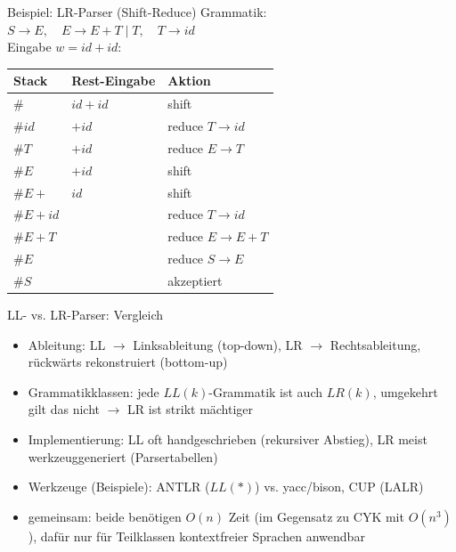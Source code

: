 \begin{frame}{Beispiel: LR-Parser (Shift-Reduce)}
	Grammatik: $S \rightarrow E, \quad E \rightarrow E+T \mid T, \quad T \rightarrow id$\\
	Eingabe $w=id+id$:\\[0.3em]
	\centering
	\begin{tabular}{|l|l|l|}
		\hline
		Stack & Rest-Eingabe & Aktion \\
		\hline
		\# & $id+id$ & shift \\
		\#$id$ & $+id$ & reduce $T\rightarrow id$ \\
		\#$T$ & $+id$ & reduce $E\rightarrow T$ \\
		\#$E$ & $+id$ & shift \\
		\#$E{+}$ & $id$ & shift \\
		\#$E{+}id$ &  & reduce $T\rightarrow id$ \\
		\#$E{+}T$ &  & reduce $E\rightarrow E{+}T$ \\
		\#$E$ &  & reduce $S\rightarrow E$ \\
		\#$S$ &  & akzeptiert \\
		\hline
	\end{tabular}
\end{frame}

\begin{frame}{LL- vs. LR-Parser: Vergleich}
	\begin{itemize}
		\item Ableitung: LL $\rightarrow$ Linksableitung (top-down), LR $\rightarrow$ Rechtsableitung, rückwärts rekonstruiert (bottom-up)
		\item Grammatikklassen: jede $LL(k)$-Grammatik ist auch $LR(k)$, umgekehrt gilt das nicht $\rightarrow$ LR ist strikt mächtiger
		\item Implementierung: LL oft handgeschrieben (rekursiver Abstieg), LR meist werkzeuggeneriert (Parsertabellen)
		\item Werkzeuge (Beispiele): ANTLR ($LL(*)$) vs. yacc/bison, CUP (LALR)
		\item gemeinsam: beide benötigen $O(n)$ Zeit (im Gegensatz zu CYK mit $O(n^3)$), dafür nur für Teilklassen kontextfreier Sprachen anwendbar
	\end{itemize}
\end{frame}

